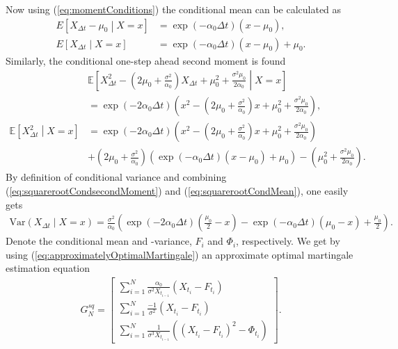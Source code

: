 Now using (\ref{eq:momentConditions}) the conditional mean can be calculated as
\begin{align}
    E\left[X_{\Delta t} - \mu_0 \middle| X = x\right] &= \exp\left(-\alpha_0\Delta t\right)\left(x-\mu_0\right),\\
    E\left[X_{\Delta t} \middle| X = x\right] &= \exp\left(-\alpha_0\Delta t\right)\left(x-\mu_0\right) + \mu_0. \label{eq:squarerootCondMean}
\end{align}
Similarly, the conditional one-step ahead second moment is found
\begin{align}
    &\mathbb{E}\left[X_{\Delta t}^2 - \left(2\mu_0 + \frac{\sigma^2}{\alpha_0}\right)X_{\Delta t} + \mu_0^2 + \frac{\sigma^2\mu_0}{2\alpha_0} \middle| X = x \right] \nonumber \\
    &= \exp\left(-2\alpha_0 \Delta t\right)\left(x^2 - \left(2\mu_0 + \frac{\sigma^2}{\alpha_0}\right)x + \mu_0^2 + \frac{\sigma^2 \mu_0}{2\alpha_0}\right),\\
    \mathbb{E}\left[X_{\Delta t}^2 \middle| X = x\right] &= \exp\left(-2\alpha_0 \Delta t\right)\left(x^2 - \left(2\mu_0 + \frac{\sigma^2}{\alpha_0}\right)x + \mu_0^2 + \frac{\sigma^2 \mu_0}{2\alpha_0}\right)  \nonumber  \\
     &+ \left(2\mu_0 + \frac{\sigma^2}{\alpha_0}\right) \left(\exp\left(-\alpha_0\Delta t \right)\left(x-\mu_0\right) + \mu_0\right) - \left(\mu_0^2 + \frac{\sigma^2\mu_0}{2\alpha_0}\right). \label{eq:squarerootCondsecondMoment}
\end{align}
By definition of conditional variance and combining (\ref{eq:squarerootCondsecondMoment}) and (\ref{eq:squarerootCondMean}), one easily gets
\begin{align}
    \mathrm{Var}\left(X_{\Delta t} \middle| X = x \right) = \frac{\sigma^2}{\alpha_0}\left(\exp\left(-2\alpha_0\Delta t \right)\left(\frac{\mu_0}{2} - x   \right) - \exp\left(-\alpha_0\Delta t\right)\left(\mu_0 - x\right) + \frac{\mu_0}{2}\right). \label{eq:squarerootCondVariance}
\end{align}
Denote the conditional mean and -variance, $F_i$ and $\Phi_i$, respectively. We get by using (\ref{eq:approximatelyOptimalMartingale}) an approximate optimal martingale estimation equation
\begin{align}
        G_N^{sq} = \begin{bmatrix}
            \sum_{i = 1}^N \frac{\alpha_0}{\sigma^2 X_{t_{i-1}}}\left(X_{t_i} - F_{t_i}\right)\\
            \sum_{i = 1}^N \frac{-1}{\sigma^2}\left(X_{t_i} - F_{t_i}\right)\\
            \sum_{i = 1}^N \frac{1}{\sigma^3 X_{t_{i-1}}}\left(\left(X_{t_i} - F_{t_i}\right)^2 - \Phi_{t_i}\right) \label{eq:squarerootMartingaleEquation}
        \end{bmatrix}.
\end{align}
